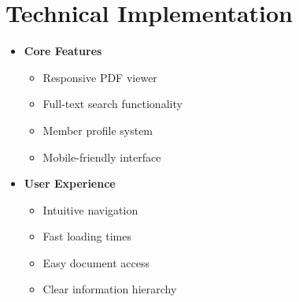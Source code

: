 \documentclass{article}
\begin{document}
\section*{Technical Implementation}
\begin{feubox}
\begin{itemize}[leftmargin=*]
    \item \textbf{Core Features}
    \begin{itemize}
        \item Responsive PDF viewer
        \item Full-text search functionality
        \item Member profile system
        \item Mobile-friendly interface
    \end{itemize}
    
    \item \textbf{User Experience}
    \begin{itemize}
        \item Intuitive navigation
        \item Fast loading times
        \item Easy document access
        \item Clear information hierarchy
    \end{itemize}
\end{itemize}
\end{feubox}
\end{document}
